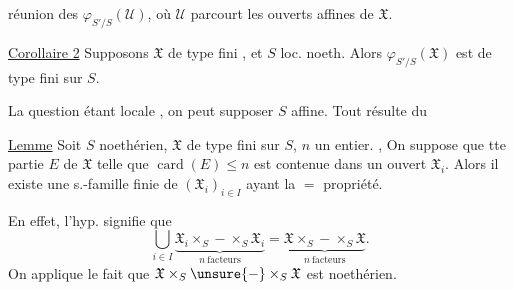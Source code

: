 réunion des $\varphi_{S'/S}(\mathcal U)$, où $\mathcal U$ parcourt les
ouverts affines de $\mathfrak X$.

\uline{Corollaire 2} Supposons 
$\mathfrak X$ de type fini , et $S$ loc. noeth.
Alors $\varphi_{S'/S}(\mathfrak X)$ est de type fini sur $S$.

La question étant locale , on peut supposer $S$ affine.
Tout résulte du

\uline{Lemme} Soit $S$ noethérien, $\mathfrak X$ de type fini sur $S$,
$n$ un entier. ,
On suppose que tte partie  $E$ de $\mathfrak X$ telle que
$\operatorname{card}(E)\leq n$ est contenue dans un ouvert
 $\mathfrak X_i$. Alors il existe une s.-famille finie
de $(\mathfrak X_i)_{i\in I}$ ayant la $=$ propriété.

En effet, l'hyp. signifie que
\[
\bigcup_{i\in I}\underbrace{\mathfrak X_i\times_S-\times_S\mathfrak X_i}_{n\ \text{facteurs}}
=\underbrace{\mathfrak X\times_S-\times_S\mathfrak X}_{n\ \text{facteurs}}.
\]
On applique le fait que $\mathfrak X\times_S\unsure{-}\times_S\mathfrak X$
est  noethérien.

